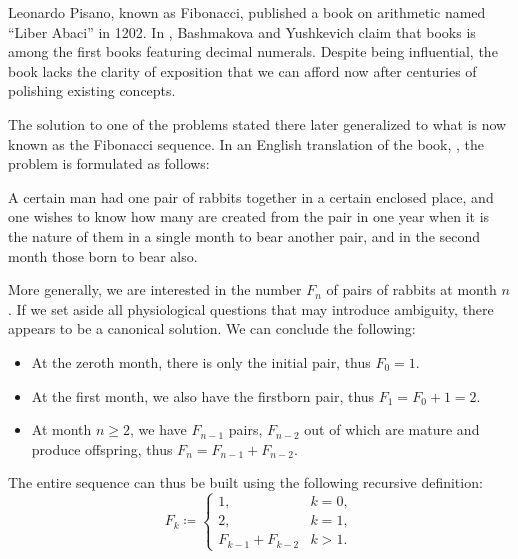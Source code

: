 \begin{example}\label{ex:fibonacci_rabbits}
  Leonardo Pisano, known as Fibonacci, published a book on arithmetic named \enquote{Liber Abaci} in 1202. In \cite[54]{АлександровМаркушевичХинчинИПр1951ЭнциклопедияТом1}, Bashmakova and Yushkevich claim that books is among the first books featuring decimal numerals. Despite being influential, the book lacks the clarity of exposition that we can afford now after centuries of polishing existing concepts.

  The solution to one of the problems stated there later generalized to what is now known as the Fibonacci sequence. In an English translation of the book, \cite{Fibonacci2002LiberAbaci}, the problem is formulated as follows:
  \begin{displayquote}
    A certain man had one pair of rabbits together in a certain enclosed place, and one wishes to know how many are created from the pair in one year when it is the nature of them in a single month to bear another pair, and in the second month those born to bear also.
  \end{displayquote}

  More generally, we are interested in the number \( F_n \) of pairs of rabbits at month \( n \). If we set aside all physiological questions that may introduce ambiguity, there appears to be a canonical solution. We can conclude the following:
  \begin{itemize}
    \item At the zeroth month, there is only the initial pair, thus \( F_0 = 1 \).

    \item At the first month, we also have the firstborn pair, thus \( F_1 = F_0 + 1 = 2 \).

    \item At month \( n \geq 2 \), we have \( F_{n-1} \) pairs, \( F_{n-2} \) out of which are mature and produce offspring, thus \( F_n = F_{n-1} + F_{n-2} \).
  \end{itemize}

  The entire sequence can thus be built using the following recursive definition:
  \begin{equation*}
    F_k \coloneqq \begin{cases}
      1,                &k = 0, \\
      2,                &k = 1, \\
      F_{k-1} + F_{k-2} &k > 1.
    \end{cases}
  \end{equation*}


\end{example}
